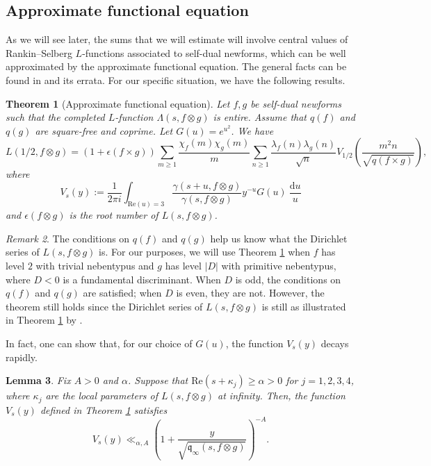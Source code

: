 \documentclass[11pt]{amsart}
\newcommand{\q}{\mathfrak{q}}
\newtheorem{theorem}{Theorem}[section]
\newtheorem{lemma}[theorem]{Lemma}
\theoremstyle{definition}
\theoremstyle{remark}
\newtheorem{remark}[theorem]{Remark}
\begin{document}
\subsection{Approximate functional equation}

As we will see later, the sums that we will estimate will involve central values of Rankin--Selberg $L$-functions associated to self-dual newforms, which can be well approximated by the approximate functional equation. The general facts can be found in \cite[\S 5.2]{IwaniecKowalski} and its errata. For our specific situation, we have the following results.

\begin{theorem}[Approximate functional equation]\label{AppFuncEq1}
Let $f,g$ be self-dual newforms such that the completed $L$-function $\Lambda(s,f\otimes g)$ is entire. Assume that $q(f)$ and $q(g)$ are square-free and coprime. Let $G(u) = e^{u^2}$. We have $$L(1/2, f\otimes g) = (1+\epsilon(f\times g)) \sum_{m\geq 1} \frac{\chi_f(m) \chi_g(m)}{m} \sum_{n\geq 1} \frac{\lambda_f(n) \lambda_g(n)}{\sqrt{n}} V_{1/2} \left( \frac{m^2 n}{\sqrt{q(f\times g)}} \right),$$ where $$V_s(y) := \frac{1}{2\pi i} \int_{\mathrm{Re}(u)=3} \frac{\gamma(s+u,f\otimes g)}{\gamma(s,f\otimes g)} y^{-u} G(u) \: \frac{\mathrm{d}u}{u}$$ and $\epsilon(f\otimes g)$ is the root number of $L(s,f\otimes g)$.
\end{theorem}

\begin{remark}\label{AppFuncEqHoldsForDeven}
The conditions on $q(f)$ and $q(g)$ help us know what the Dirichlet series of $L(s,f\otimes g)$ is. For our purposes, we will use Theorem \ref{AppFuncEq1} when $f$ has level $2$ with trivial nebentypus and $g$ has level $|D|$ with primitive nebentypus, where $D<0$ is a fundamental discriminant. When $D$ is odd, the conditions on $q(f)$ and $q(g)$ are satisfied; when $D$ is even, they are not. However, the theorem still holds since the Dirichlet series of $L(s,f\otimes g)$ is still as illustrated in Theorem \ref{AppFuncEq1} by \cite[Thm. 2.2]{WinnieLiRankinSelberg}.
\end{remark}

In fact, one can show that, for our choice of $G(u)$, the function $V_s(y)$ decays rapidly.

\begin{lemma}\label{DecayVsy}
Fix $A>0$ and $\alpha$. Suppose that $\mathrm{Re}(s+\kappa_j) \geq \alpha >0$ for $j=1,2,3,4$, where $\kappa_j$ are the local parameters of $L(s,f\otimes g)$ at infinity. Then, the function $V_s(y)$ defined in Theorem \ref{AppFuncEq1} satisfies $$ V_s(y) \ll_{\alpha,A} \left(1+\frac{y}{\sqrt{\q_{\infty}(s,f\otimes g)}} \right)^{-A}.$$
\end{lemma}
\end{document}
